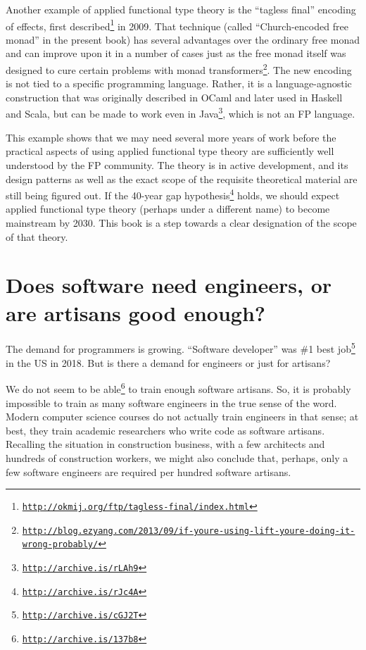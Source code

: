 Another example of applied functional type theory is the  ``tagless
final'' encoding of effects, first described\footnote{\texttt{\href{http://okmij.org/ftp/tagless-final/index.html}{http://okmij.org/ftp/tagless-final/index.html}}}
in 2009. That technique (called ``Church-encoded free monad'' in
the present book) has several advantages over the ordinary free monad
and can improve upon it in a number of cases \textemdash{} just as
the free monad itself was designed to cure certain problems with monad
transformers\footnote{\texttt{\href{http://blog.ezyang.com/2013/09/if-youre-using-lift-youre-doing-it-wrong-probably/}{http://blog.ezyang.com/2013/09/if-youre-using-lift-youre-doing-it-wrong-probably/}}}.
The new encoding is not tied to a specific programming language. Rather,
it is a language-agnostic construction that was originally described
in OCaml and later used in Haskell and Scala, but can be made to work
even in Java\footnote{\texttt{\href{http://archive.is/rLAh9}{http://archive.is/rLAh9}}},
which is not an FP language.

This example shows that we may need several more years of work before
the practical aspects of using applied functional type theory are
sufficiently well understood by the FP community. The theory is in
active development, and its design patterns \textemdash{} as well
as the exact scope of the requisite theoretical material \textemdash{}
are still being figured out. If the 40-year gap hypothesis\footnote{\texttt{\href{http://archive.is/rJc4A}{http://archive.is/rJc4A}}}
holds, we should expect applied functional type theory (perhaps under
a different name) to become mainstream by 2030. This book is a step
towards a clear designation of the scope of that theory.

\section{Does software need engineers, or are artisans good enough? }

The demand for programmers is growing. ``Software developer'' was
\#1 best job\footnote{\texttt{\href{http://archive.is/cGJ2T}{http://archive.is/cGJ2T}}}
in the US in 2018. But is there a demand for engineers or just for
artisans?

We do not seem to be able\footnote{\texttt{\href{http://archive.is/137b8}{http://archive.is/137b8}}}
to train enough software artisans. So, it is probably impossible to
train as many software engineers in the true sense of the word. Modern
computer science courses do not actually train engineers in that sense;
at best, they train academic researchers who write code as software
artisans. Recalling the situation in construction business, with a
few architects and hundreds of construction workers, we might also
conclude that, perhaps, only a few software engineers are required
per hundred software artisans.

